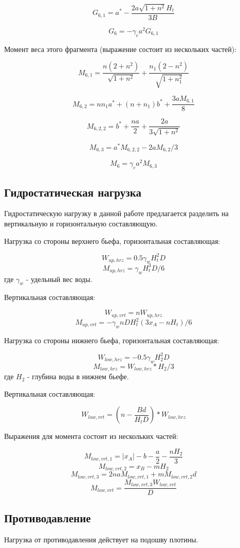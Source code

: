 \documentclass[12pt,a4paper,oneside,draft,titlepage]{article}
\begin{document}
$$ G_{6,1} = a^* - \frac{2  a  \sqrt{1 + n ^ 2}  H_t} { 3  B} $$
 
$$ G_6 = -\gamma_c  a ^ 2  G_{6,1} $$

Момент веса этого фрагмента (выражение состоит из нескольких частей):

$$ M_{6,1} = \frac{n  (2 + n ^ 2)}{\sqrt{1 + n ^ 2}} + \frac{n_1  (2 - n ^ 2)}{ \sqrt{1 + n_1 ^ 2}} $$

$$ M_{6,2} = n  n_1  a^* + (n + n_1)  b^* + \frac{3  a  M_{6,1}}{8} $$

$$ M_{6,2,2} = b^* + \frac{n  a}{2} + \frac{2  a} { 3  \sqrt{1 + n ^ 2}} $$

$$ M_{6,3} = a^*  M_{6,2,2} - 2  a  M_{6,2} / 3 $$

$$ M_6 = \gamma_c  a ^ 2  M_{6,3} $$

\subsection{Гидростатическая нагрузка}

Гидростатическую нагрузку в данной работе предлагается разделить на вертикальную и горизонтальную составляющую.

Нагрузка со стороны верхнего бьефа, горизонтальная составляющая:

$$ W_{up,hrz} = 0.5  \gamma_w  H_t ^ 2  D $$
$$ M_{up,hrz} = \gamma_w  H_t ^ 3  D / 6 $$
где $\gamma_w$ - удельный вес воды.

Вертикальная составляющая:

$$ W_{up,vrt} = n  W_{up,hrz} $$
$$ M_{up,vrt} = -\gamma_w  n  D  H_t ^ 2  (3  x_A - n  H_t) / 6 $$

Нагрузка со стороны нижнего бьефа, горизонтальная составляющая:

$$ W_{low,hrz} = -0.5  \gamma_w  H_2 ^ 2  D $$
$$ M_{low,hrz} = W_{low,hrz} * H_2 / 3 $$
где $H_2$ - глубина воды в нижнем бьефе.

Вертикальная составляющая:

$$ W_{low,vrt} = (n - \frac{B  d}{H_t  D}) * W_{low,hrz} $$
 
Выражения для момента состоит из нескольких частей:

$$ M_{low,vrt,1} = |x_A| - b - \frac{a}{2} - \frac{n  H_2}{3} $$
$$ M_{low,vrt,2} = x_B - m  H_2 $$
$$ M_{low,vrt,3} = 2  n  a  M_{low,vrt,1} + m  M_{low,vrt,2}  d $$
$$ M_{low,vrt} = \frac{M_{low,vrt,3}  W_{low,vrt}}{D} $$

\subsection{Противодавление}
Нагрузка от противодавления действует на подошву плотины.
\end{document}

